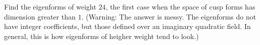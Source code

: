 \documentclass[11pt, oneside,margin=1in]{article}
\begin{document}
\begin{exercise}\label{}\text{}
Find the eigenforms of weight $24$, the first case when the space of cusp forms has dimension greater than $1$. (Warning: The answer is messy. The eigenforms do not have integer coefficients, but those defined over an imaginary quadratic field. In general, this is how eigenforms of heigher weight tend to look.)
\end{exercise}

\printindex
\end{document}
